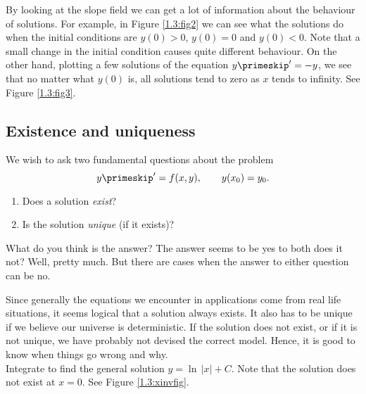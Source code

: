 By looking at the slope field we can get a lot of information
about the behaviour of
solutions.  For
example, in Figure \ref{1.3:fig2} we can see what the solutions do when the initial conditions
are $y(0) > 0$, $y(0) = 0$ and $y(0) < 0$.  Note that a small change in the
initial condition causes quite different behaviour.
On the other hand, plotting a few solutions of the equation
$y\primeskip ' = -y$,
we see that no matter what $y(0)$ is, all solutions tend to zero as $x$
tends to infinity.
See Figure \ref{1.3:fig3}.


\subsection*{Existence and uniqueness}

We wish to ask two fundamental questions about the problem
\begin{equation*}
y\primeskip ' = f(x,y), \qquad y(x_0) = y_0.
\end{equation*}
\begin{enumerate}[label=(\roman*)]
\item Does a solution \emph{exist}?
\item Is the solution \emph{unique} (if it exists)?
\end{enumerate}

What do you think is the answer?
The answer seems to be yes to both does it not?  Well, pretty much.  But there
are cases when the answer to either question can be no.

Since generally the equations we encounter in applications
come from real life situations, it seems
logical that a solution always exists.
It also has to be unique if we believe our
universe is deterministic.  If the solution does not exist, or if it is
not unique, we have
probably not devised the correct model.  Hence, it is good to know
when things go wrong and why.\\

{
Integrate to find the general solution $y = \ln \, \lvert x \rvert + C$.  Note that the
solution does not exist at $x=0$.  See Figure \ref{1.3:xinvfig}.
}\\


